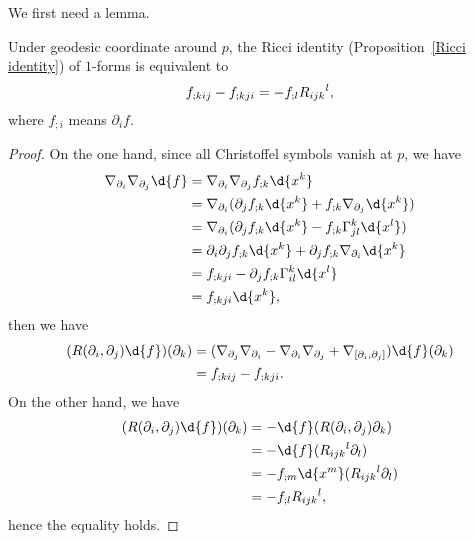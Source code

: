 We first need a lemma.
\begin{lem}
    Under geodesic coordinate around $p$, the Ricci identity (Proposition~\ref{Ricci identity}) of $1$-forms is equivalent to
    \[f_{;kij}-f_{;kji}=-f_{;l}\R{l}{i}{j}{k},\]
    where $f_{;i}$ means $\partial_if$.
\end{lem}
\begin{proof}
    On the one hand, since all Christoffel symbols vanish at $p$, we have
    \begin{align*}
        \nabla_{\partial_i}\nabla_{\partial_j}\d{f}&=\nabla_{\partial_i}\nabla_{\partial_j}f_{;k}\d{x^k}\\
        &=\nabla_{\partial_i}(\partial_jf_{;k}\d{x^k}+f_{;k}\nabla_{\partial_j}\d{x^k})\\
        &=\nabla_{\partial_i}(\partial_jf_{;k}\d{x^k}-f_{;k}\Gamma^k_{jl}\d{x^l})\\
        &=\partial_i\partial_jf_{;k}\d{x^k}+\partial_jf_{;k}\nabla_{\partial_i}\d{x^k}\\
        &=f_{;kji}-\partial_jf_{;k}\Gamma^k_{il}\d{x^l}\\
        &=f_{;kji}\d{x^k},
    \end{align*}
    then we have
    \begin{align*}
        (R(\partial_i,\partial_j)\d{f})(\partial_k)&=(\nabla_{\partial_j}\nabla_{\partial_i}-\nabla_{\partial_i}\nabla_{\partial_j}+\nabla_{[\partial_i,\partial_j]})\d{f}(\partial_k)\\
        &=f_{;kij}-f_{;kji}.
    \end{align*}
    On the other hand, we have
    \begin{align*}
        (R(\partial_i,\partial_j)\d{f})(\partial_k)&=-\d{f}(R(\partial_i,\partial_j)\partial_k)\\
        &=-\d{f}(\R{l}{i}{j}{k}\partial_l)\\
        &=-f_{;m}\d{x^m}(\R{l}{i}{j}{k}\partial_l)\\
        &=-f_{;l}\R{l}{i}{j}{k},
    \end{align*}
    hence the equality holds.
\end{proof}

